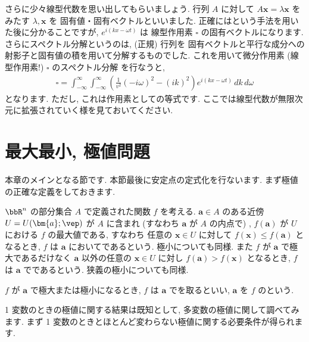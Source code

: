 \documentclass[openany, a4paper, oneside]{jsbook}
\begin{document}
さらに少々線型代数を思い出してもらいましょう. 行列 $A$ に対して $A\bm{x}=\lambda \bm{x}$ をみたす $\lambda , \bm{x}$ を
固有値・固有ベクトルといいました.
正確にはという手法を用いた後に分かることですが,  $e^{i (kx-\omega t)}$ は
線型作用素 $\square$ の固有ベクトルになります.
さらにスペクトル分解というのは, (正規) 行列を
固有ベクトルと平行な成分への射影子と固有値の積を用いて分解するものでした.
これを用いて微分作用素 (線型作用素!) $\square$ のスペクトル分解 を行なうと,
\begin{align}
\square
=
\int _{-\infty} ^{\infty}\int _{-\infty} ^{\infty}
\left (
\frac{1} {v^2} (-i\omega )^2 - (i k) ^2
\right)
e^{i (k x - \omega t)} \, d k \, d\omega
\end{align}
となります. ただし, これは作用素としての等式です.
ここでは線型代数が無限次元に拡張されていく様を見ておいてください.
\section{最大最小, 極値問題}

本章のメインとなる節です.
本節最後に安定点の定式化を行ないます.
まず極値の正確な定義をしておきます.
\begin{defn}
$\bbR^n$ の部分集合 $A$ で定義された関数 $f$ を考える.
$\bm{a}\in A$
のある近傍 $U=U (\bm{a}; \vep)$ が $A$ に含まれ (すなわち $\bm{a}$ が $A$ の内点で) ,
$f (\bm{a})$ が $U$ における $f$ の最大値である, すなわち
任意の $\bm{x}\in U$ に対して $f (\bm{x}) \leq f (\bm{a})$ となるとき,
$f$ は $\bm{a}$ においてであるという.
極小についても同様.
また $f$ が $\bm{a}$ で極大であるだけなく
$\bm{a}$ 以外の任意の $\bm{x} \in U$ に対し $f (\bm{a}) > f ( \bm{x} )$ となるとき,
$f$ は $\bm{a}$ でであるという.
狭義の極小についても同様.

$f$ が $\bm{a}$ で極大または極小になるとき,  $f$ は $\bm{a}$ でを取るといい,
$\bm{a}$ を $f$ のという.
\end{defn}
1 変数のときの極値に関する結果は既知として, 多変数の極値に関して調べてみます.
まず 1 変数のときとほとんど変わらない極値に関する必要条件が得られます.
\end{document}
